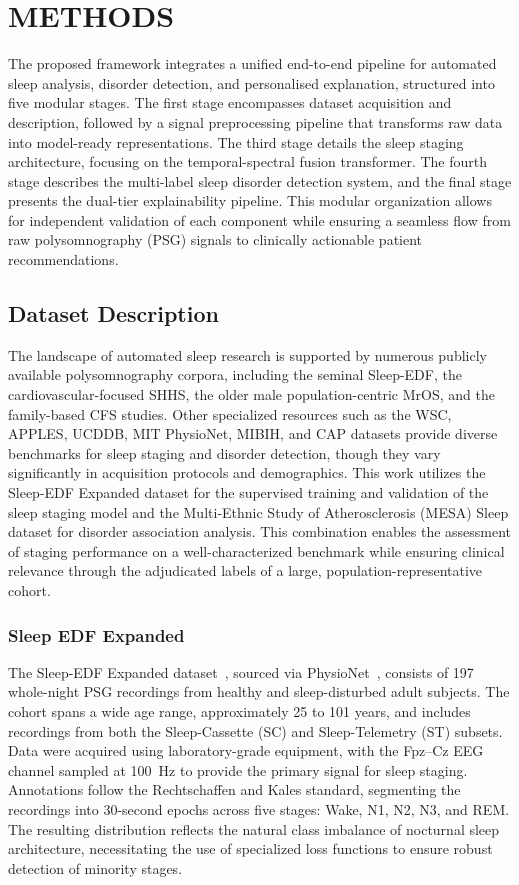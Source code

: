 \section{METHODS}

The proposed framework integrates a unified end-to-end pipeline for automated sleep analysis, disorder detection, and personalised explanation, structured into five modular stages. The first stage encompasses dataset acquisition and description, followed by a signal preprocessing pipeline that transforms raw data into model-ready representations. The third stage details the sleep staging architecture, focusing on the temporal-spectral fusion transformer. The fourth stage describes the multi-label sleep disorder detection system, and the final stage presents the dual-tier explainability pipeline. This modular organization allows for independent validation of each component while ensuring a seamless flow from raw polysomnography (PSG) signals to clinically actionable patient recommendations.

\subsection{Dataset Description}

The landscape of automated sleep research is supported by numerous publicly available polysomnography corpora, including the seminal Sleep-EDF, the cardiovascular-focused SHHS, the older male population-centric MrOS, and the family-based CFS studies. Other specialized resources such as the WSC, APPLES, UCDDB, MIT PhysioNet, MIBIH, and CAP datasets provide diverse benchmarks for sleep staging and disorder detection, though they vary significantly in acquisition protocols and demographics. This work utilizes the Sleep-EDF Expanded dataset for the supervised training and validation of the sleep staging model and the Multi-Ethnic Study of Atherosclerosis (MESA) Sleep dataset for disorder association analysis. This combination enables the assessment of staging performance on a well-characterized benchmark while ensuring clinical relevance through the adjudicated labels of a large, population-representative cohort.

\subsubsection{Sleep EDF Expanded}

The Sleep-EDF Expanded dataset~\cite{sleepedfx}, sourced via PhysioNet~\cite{physiobank}, consists of 197 whole-night PSG recordings from healthy and sleep-disturbed adult subjects. The cohort spans a wide age range, approximately 25 to 101 years, and includes recordings from both the Sleep-Cassette (SC) and Sleep-Telemetry (ST) subsets. Data were acquired using laboratory-grade equipment, with the Fpz--Cz EEG channel sampled at 100~Hz to provide the primary signal for sleep staging. Annotations follow the Rechtschaffen and Kales standard, segmenting the recordings into 30-second epochs across five stages: Wake, N1, N2, N3, and REM. The resulting distribution reflects the natural class imbalance of nocturnal sleep architecture, necessitating the use of specialized loss functions to ensure robust detection of minority stages.

